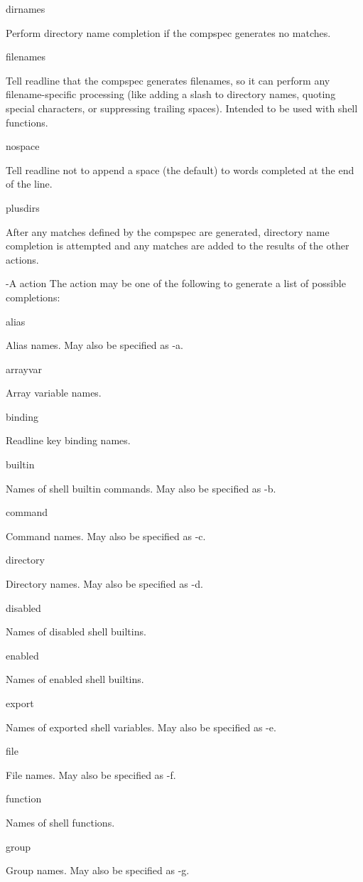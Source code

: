 dirnames

Perform directory name completion if the compspec generates no matches.

filenames

Tell readline that the compspec generates filenames, so it can perform any filename-specific processing (like adding a slash to directory names, quoting special characters, or suppressing trailing spaces). Intended to be used with shell functions.

nospace

Tell readline not to append a space (the default) to words completed at the end of the line.

plusdirs

After any matches defined by the compspec are generated, directory name completion is attempted and any matches are added to the results of the other actions.

-A action
The action may be one of the following to generate a list of possible completions:

alias

Alias names. May also be specified as -a.

arrayvar

Array variable names.

binding

Readline key binding names.

builtin

Names of shell builtin commands. May also be specified as -b.

command

Command names. May also be specified as -c.

directory

Directory names. May also be specified as -d.

disabled

Names of disabled shell builtins.

enabled

Names of enabled shell builtins.

export

Names of exported shell variables. May also be specified as -e.

file

File names. May also be specified as -f.

function

Names of shell functions.

group

Group names. May also be specified as -g.

